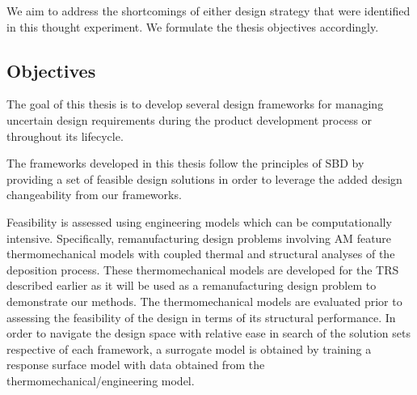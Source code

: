 We aim to address the shortcomings of either design strategy that were identified in this thought experiment. We formulate the thesis objectives accordingly.

\subsection{Objectives} \label{subsec:objectives}




The goal of this thesis is to develop several design frameworks for managing uncertain design requirements during the product development process or throughout its lifecycle. 

The frameworks developed in this thesis follow the principles of \acf{SBD} by providing a set of feasible design solutions in order to leverage the added design changeability from our frameworks. 

Feasibility is assessed using engineering models which can be computationally intensive. Specifically, remanufacturing design problems involving \ac{AM} feature thermomechanical models with coupled thermal and structural analyses of the deposition process. These thermomechanical models are developed for the \ac{TRS} described earlier as it will be used as a remanufacturing design problem to demonstrate our methods. The thermomechanical models are evaluated prior to assessing the feasibility of the design in terms of its structural performance. In order to navigate the design space with relative ease in search of the solution sets respective of each framework, a surrogate model is obtained by training a response surface model with data obtained from the thermomechanical/engineering model.


